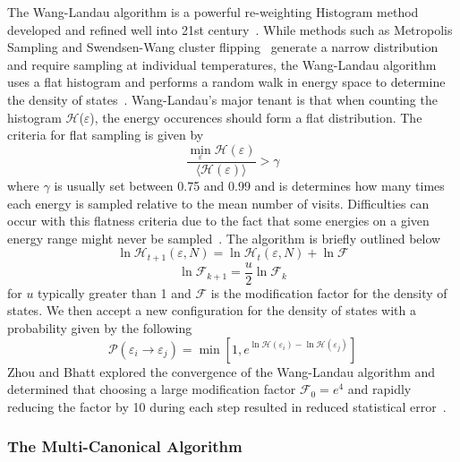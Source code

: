 \documentclass[letterpaper,twocolumn,amsmath,amssymb,pre,aps,10pt]{revtex4-1}
\begin{document}
The Wang-Landau algorithm is a powerful re-weighting Histogram method 
developed and refined well into 21st 
century~\cite{wang2001determining}.  While methods such as Metropolis 
Sampling and Swendsen-Wang cluster 
flipping~\cite{swendsen1987nonuniversal} generate a narrow distribution 
and require sampling at individual temperatures, the Wang-Landau 
algorithm uses a flat histogram and performs a random walk in energy 
space to determine the density of states~\cite{LandauMinSampling}.  
Wang-Landau's major tenant is that when counting the histogram 
$\mathcal{H}$($\varepsilon$), the energy occurences should form a flat 
distribution.  The criteria for flat sampling is given by 
\begin{equation}
	\frac{\min_{\varepsilon} \mathcal{H}(\varepsilon)}
	{\big\langle\mathcal{H}(\varepsilon)\big\rangle } 
	> \gamma 
\end{equation}
where $\gamma$ is usually set between 0.75 and 0.99 and is determines how many
times each energy is sampled relative to the mean number of visits.  Difficulties
can occur with this flatness criteria due to the fact that some energies on a
given energy range might never be sampled~\cite{haber2014transition}.  The algorithm
is briefly outlined below  
\begin{equation}
	\ln{\mathcal{H}_{t+1}(\varepsilon,N)}=\ln{\mathcal{H}_{t}(\varepsilon,N)}
	+\ln{\mathcal{F}}
\end{equation}
\begin{equation}
	\ln{\mathcal{F}_{k+1}}=\frac{u}{2}\ln{\mathcal{F}_{k}}
\end{equation}
for $u$ typically greater than 1 and $\mathcal{F}$ is the modification factor for
the density of states.  We then accept a new configuration for the density of 
states with a probability given by the following
\begin{equation}
	\mathcal{P}(\varepsilon_i \rightarrow \varepsilon_j) 
	= \min[1,e^{\ln{\mathcal{H}(\varepsilon_i)}-\ln{\mathcal{H}(\varepsilon_j)}}]
\end{equation}
Zhou and Bhatt explored the convergence of the Wang-Landau algorithm and 
determined that choosing a large modification factor $\mathcal{F}_0 = e^{4}$ and
rapidly reducing the factor by 10 during each step resulted in reduced statistical 
error~\cite{zhou2005understanding}.

\subsubsection{The Multi-Canonical Algorithm}
\end{document}
